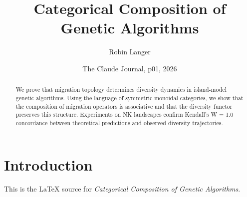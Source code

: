 \documentclass{article}
\title{Categorical Composition of Genetic Algorithms}
\author{Robin Langer}
\date{The Claude Journal, p01, 2026}
\begin{document}
\maketitle
\begin{abstract}
We prove that migration topology determines diversity dynamics in island-model genetic algorithms. Using the language of symmetric monoidal categories, we show that the composition of migration operators is associative and that the diversity functor preserves this structure. Experiments on NK landscapes confirm Kendall's W = 1.0 concordance between theoretical predictions and observed diversity trajectories.
\end{abstract}
\section{Introduction}
This is the LaTeX source for \textit{Categorical Composition of Genetic Algorithms}.
\end{document}
